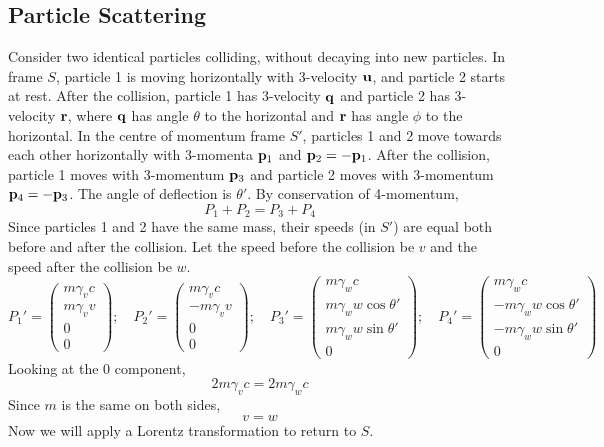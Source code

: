 \subsection{Particle Scattering}
Consider two identical particles colliding, without decaying into new particles. In frame \(S\), particle 1 is moving horizontally with 3-velocity \(\vb u\), and particle 2 starts at rest. After the collision, particle 1 has 3-velocity \(\vb q\) and particle 2 has 3-velocity \(\vb r\), where \(\vb q\) has angle \(\theta\) to the horizontal and \(\vb r\) has angle \(\phi\) to the horizontal. In the centre of momentum frame \(S'\), particles 1 and 2 move towards each other horizontally with 3-momenta \(\vb p_1\) and \(\vb p_2 = -\vb p_1\). After the collision, particle 1 moves with 3-momentum \(\vb p_3\) and particle 2 moves with 3-momentum \(\vb p_4 = -\vb p_3\). The angle of deflection is \(\theta'\). By conservation of 4-momentum,
\[ P_1 + P_2 = P_3 + P_4 \]
Since particles 1 and 2 have the same mass, their speeds (in \(S'\)) are equal both before and after the collision. Let the speed before the collision be \(v\) and the speed after the collision be \(w\).
\[ P_1' = \begin{pmatrix}
		m\gamma_v c \\
		m\gamma_v v \\
		0           \\
		0
	\end{pmatrix};\quad P_2' = \begin{pmatrix}
		m\gamma_v c  \\
		-m\gamma_v v \\
		0            \\
		0
	\end{pmatrix};\quad P_3' = \begin{pmatrix}
		m\gamma_w c             \\
		m\gamma_w w \cos\theta' \\
		m\gamma_w w \sin\theta' \\
		0
	\end{pmatrix};\quad P_4' = \begin{pmatrix}
		m\gamma_w c              \\
		-m\gamma_w w \cos\theta' \\
		-m\gamma_w w \sin\theta' \\
		0
	\end{pmatrix}  \]
Looking at the 0 component,
\[ 2 m\gamma_v c = 2m\gamma_w c \]
Since \(m\) is the same on both sides,
\[ v = w \]
Now we will apply a Lorentz transformation to return to \(S\).
